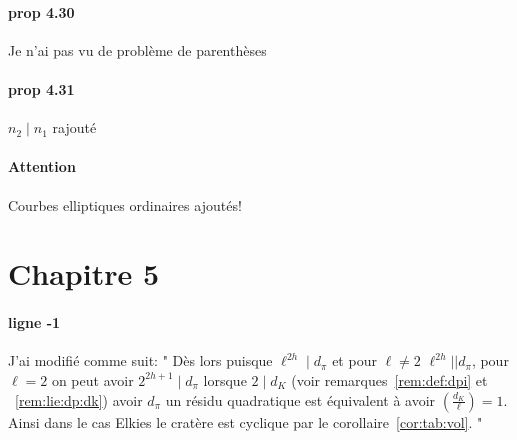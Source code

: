 \documentclass[10pt,a4paper]{article}
\theoremstyle{plain}
\theoremstyle{definition}
\theoremstyle{definition}
\theoremstyle{definition}
\theoremstyle{definition}
\theoremstyle{definition}
\theoremstyle{remark}
\theoremstyle{remark}
\theoremstyle{definition}
\begin{document}
\paragraph{prop 4.30}{Je n'ai pas vu de problème de parenthèses}

\paragraph{prop 4.31}{$n_2 \mid n_1$ rajouté}

\paragraph{Attention}{Courbes elliptiques ordinaires ajoutés!}

\section{Chapitre 5}

\paragraph{ligne -1}{J'ai modifié comme suit: "
Dès lors puisque $\ell^{2h} \mid d_{\pi}$ et pour $\ell \neq 2$ $\ell^{2h}
|| d_{\pi}$, pour $\ell=2$ on peut avoir $2^{2h+1} \mid d_{\pi}$ lorsque $2 \mid d_K$ (voir remarques~\ref{rem:def:dpi} 
et ~\ref{rem:lie:dp:dk}) avoir $d_{\pi}$ un résidu quadratique est équivalent 
à avoir $\left( \frac{d_{K}}{\ell} \right)=1$. Ainsi dans le cas Elkies le 
cratère est cyclique par le corollaire~\ref{cor:tab:vol}.
"}
\end{document}
